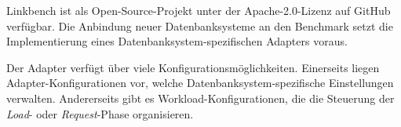 Linkbench ist als Open-Source-Projekt unter der Apache-2.0-Lizenz auf GitHub verfügbar. Die Anbindung neuer Datenbanksysteme an den Benchmark setzt die Implementierung eines Datenbanksystem-spezifischen Adapters voraus. 

Der Adapter verfügt über viele Konfigurationsmöglichkeiten. Einerseits liegen Adapter-Konfigurationen vor, welche Datenbanksystem-spezifische Einstellungen verwalten. Andererseits gibt es Workload-Konfigurationen, die die Steuerung der \textit{Load}- oder \textit{Request}-Phase organisieren. 
